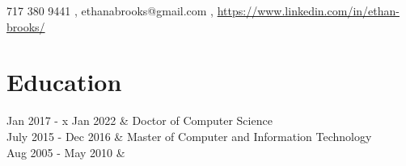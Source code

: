 \documentclass[]{resume}
\begin{document}
\pagestyle{empty} %

{\faMobile \hspace{\FAspace} 717 380 9441
	\sep
	\faEnvelope
	\hspace{\FAspace}
	ethanabrooks@gmail.com
	\sep
	\faLinkedinSquare
	\hspace{\FAspace}
	\url{https://www.linkedin.com/in/ethan-brooks/}
}

\section*{Education}
\begin{tabularcv}
	Jan 2017 - x Jan 2022 & 
  {Doctor of Computer Science}
	\\[\vspacepar] %
	July 2015 - Dec 2016 & 
	{Master of Computer and Information Technology}
	\\[\vspacepar] %
	Aug 2005 - May 2010 & 
\end{tabularcv}
\end{document}
